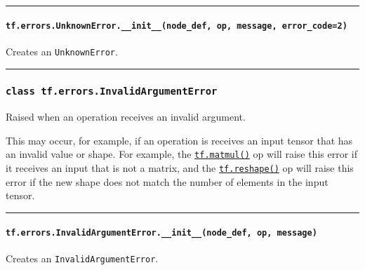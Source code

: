 \begin{center}\rule{0.5\linewidth}{\linethickness}\end{center}

\paragraph{\texorpdfstring{\texttt{tf.errors.UnknownError.\_\_init\_\_(node\_def,\ op,\ message,\ error\_code=2)}
}{tf.errors.UnknownError.\_\_init\_\_(node\_def, op, message, error\_code=2) }}\label{tf.errors.unknownerror.ux5fux5finitux5fux5fnodeux5fdef-op-message-errorux5fcode2}

Creates an \texttt{UnknownError}.

\begin{center}\rule{0.5\linewidth}{\linethickness}\end{center}

\subsubsection{\texorpdfstring{\texttt{class\ tf.errors.InvalidArgumentError}
}{class tf.errors.InvalidArgumentError }}\label{class-tf.errors.invalidargumenterror}

Raised when an operation receives an invalid argument.

This may occur, for example, if an operation is receives an input tensor
that has an invalid value or shape. For example, the
\href{../../api_docs/python/math_ops.md\#matmul}{\texttt{tf.matmul()}}
op will raise this error if it receives an input that is not a matrix,
and the
\href{../../api_docs/python/array_ops.md\#reshape}{\texttt{tf.reshape()}}
op will raise this error if the new shape does not match the number of
elements in the input tensor.

\begin{center}\rule{0.5\linewidth}{\linethickness}\end{center}

\paragraph{\texorpdfstring{\texttt{tf.errors.InvalidArgumentError.\_\_init\_\_(node\_def,\ op,\ message)}
}{tf.errors.InvalidArgumentError.\_\_init\_\_(node\_def, op, message) }}\label{tf.errors.invalidargumenterror.ux5fux5finitux5fux5fnodeux5fdef-op-message}

Creates an \texttt{InvalidArgumentError}.

